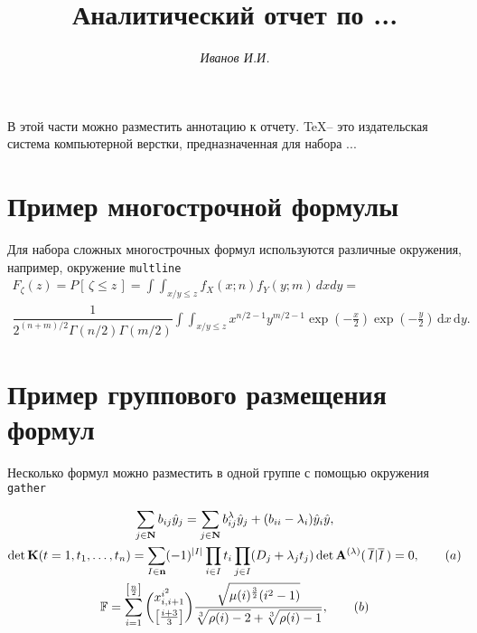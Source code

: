 \documentclass{article}
\begin{document}
\title{Аналитический отчет по ...} %
\author{\itshape Иванов И.И.} %
\date{} %
\maketitle %

\thispagestyle{fancy}

В этой части можно разместить аннотацию к отчету. \TeX -- это издательская система компьютерной верстки, предназначенная для набора ...


\tableofcontents

\section{Пример многострочной формулы}
    Для набора сложных многострочных формул используются различные окружения, например, окружение \texttt{multline}
	\begin{multline}\label{eq:FunRasp}
		F_{\zeta}(z)=P[\,\zeta\leqslant z\,] = \int\!\!\!\int_{x/y\leqslant z}f_X(x;n)f_Y(y;m)\,dxdy =\\ \dfrac{1}{2^{(n+m)/2}\Gamma(n/2)\Gamma(m/2)}\int\!\!\!\int_{x/y\leqslant z}x^{n/2-1}y^{m/2-1}\exp\left( -\frac{x}{2} \right) \exp\left( -\frac{y}{2} \right) \,\mathrm{d}x \, \mathrm{d}y.
	\end{multline}

\section{Пример группового размещения формул}

Несколько формул можно разместить в одной группе с помощью окружения \texttt{gather}

\begin{gather}
	\sum_{j \in \mathbf{N}} b_{ij} \hat{y}_{j} = \sum_{j \in \mathbf{N}} b_{ij}^\lambda \hat{y}_j + (b_{ii} - \lambda_i)\hat{y}_i \hat{y},\notag \\
	\det \mathbf{K}(t=1, t_1, \ldots, t_n) = \sum_{I \in \mathbf{n} } (-1)^{|I|} \prod_{i \in I} t_i \prod_{j \in I} (D_j + \lambda_j t_j) \det \mathbf{A}^{(\lambda)} (\, \overline{I} | \overline{I} \,) = 0,\tag{$a$} \\
	\mathbb{F} = \sum_{i=1}^{\left[ \frac{n}{2}\right] } \binom{ x_{i,i+1}^{i^2}}{ \left[ \frac{i+3}{3} \right]} {{\sqrt{\mu(i)^\frac{3}{2} (i^2-1)}} \over\displaystyle {\sqrt[3]{\rho(i)-2} + \sqrt[3]{\rho(i)-1}} }, \tag{$b$}
\end{gather}
\end{document}
